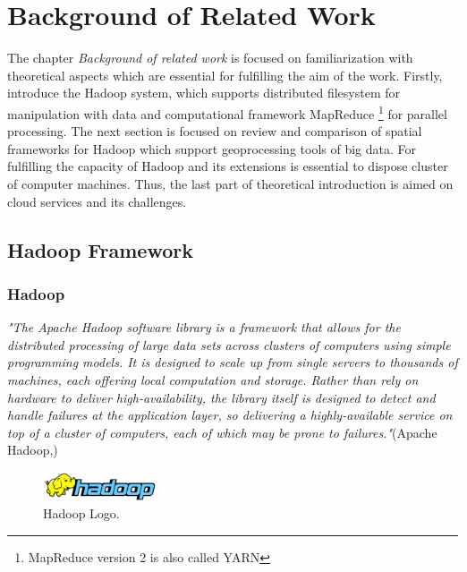 \documentclass[a4paper,12pt,oneside]{report}
\begin{document}
	
	
	
	
	
	
	\newpage
	\chapter*{Background of Related Work}
	The chapter \textit{Background of related work} is focused on familiarization
	with theoretical aspects which are essential for fulfilling the aim of the work.
	Firstly, introduce the Hadoop system, which supports distributed filesystem for
	manipulation with data and computational framework MapReduce \footnote{MapReduce version 2 is also called YARN} for
	parallel processing. 
	The next section is focused on review and comparison of spatial frameworks for
	Hadoop which support geoprocessing tools of big data. For fulfilling the
	capacity of Hadoop and its extensions is essential to dispose cluster of computer
	machines. Thus, the last  part of theoretical introduction is aimed on cloud
	services and its challenges.
	\section{Hadoop Framework}
	\label{sec:hadoop}
	\subsection*{Hadoop}
	\emph{"The Apache Hadoop software library is a framework that allows for the
		distributed
		processing of large data sets across clusters of computers using simple
		programming 
		models. It is designed to scale up from single servers to 
		thousands of machines, each offering local computation and storage. Rather
		than rely 
		on hardware to deliver high-availability, the library itself is
		designed to detect and handle failures at the application layer, so
		delivering a 
		highly-available service on top of a cluster of computers,
		each of which may be prone to failures."}(Apache Hadoop,\cite{hadoop_web})
	\begin{figure}[!htbp]
		\centering
		\includegraphics[width=0.3\textwidth]{./img/664px-Hadoop_logo.png}
		\caption[Hadoop architecture2]{\centering Hadoop Logo.}
	\end{figure}
	
\end{document}

